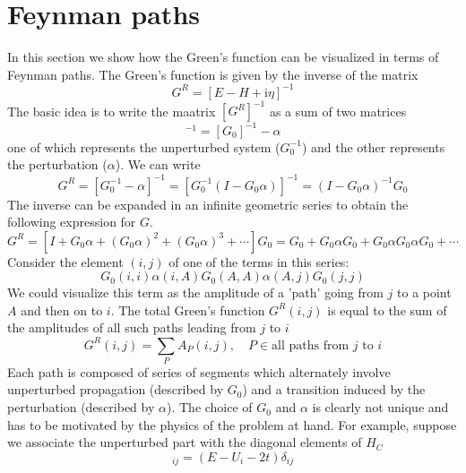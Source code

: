 \documentclass[11pt,a4paper]{book}
\theoremstyle{plain}
\theoremstyle{definition}
\theoremstyle{remark}
\newcommand{\ii}{\mathrm{i}}                      %
\begin{document}
\section{Feynman paths}
In this section we show how the Green's function can be visualized in terms of Feynman paths. The Green's function is given by the inverse of the matrix
\begin{equation}
    G^R = \left[E - H + \ii \eta \right]^{-1}
\end{equation}
The basic idea is to write the maatrix $[G^R]^{-1}$ as a sum of two matrices
\begin{equation}
    [G^R]^{-1} = [G_0]^{-1} - \alpha
\end{equation}
one of which represents the unperturbed system ($G_0^{-1}$) and the other represents the perturbation ($\alpha$). We can write 
\begin{equation}
    G^R = \left[G_0^{-1} - \alpha \right]^{-1} = \left[G_0^{-1} (I - G_0 \alpha)\right]^{-1} = (I - G_0 \alpha)^{-1} G_0
\end{equation}
The inverse can be expanded in an infinite geometric series to obtain the following expression for $G$.
\begin{equation}
    G^R = \left[I + G_0 \alpha + (G_0 \alpha)^2 + (G_0 \alpha)^3 + \cdots \right] G_0 = G_0 + G_0 \alpha G_0 + G_0 \alpha G_0 \alpha G_0 + \cdots
\end{equation}
Consider the element $(i,j)$ of one of the terms in this series:
\begin{equation}
    G_0(i,i) \alpha(i,A) G_0(A,A) \alpha(A,j) G_0(j,j)
\end{equation}
We could visualize this term as the amplitude of a 'path' going from $j$ to a point $A$ and then on to $i$. The total Green's function $G^R(i,j)$ is equal to the sum of the amplitudes of all such paths leading from $j$ to $i$
\begin{equation}
    G^R(i,j) = \sum_P A_P(i,j), \quad P \in \mbox{all paths from $j$ to $i$}
\end{equation}
Each path is composed of series of segments which alternately involve unperturbed propagation (described by $G_0$) and a transition induced by the perturbation (described by $\alpha$). The choice of $G_0$ and $\alpha$ is clearly not unique and has to be motivated by the physics of the problem at hand. For example, suppose we associate the unperturbed part with the diagonal elements of $H_C$
\begin{equation}
    [G_0^{-1}]_{ij} = (E - U_i - 2t)\delta_{ij}
\end{equation}
\end{document}
